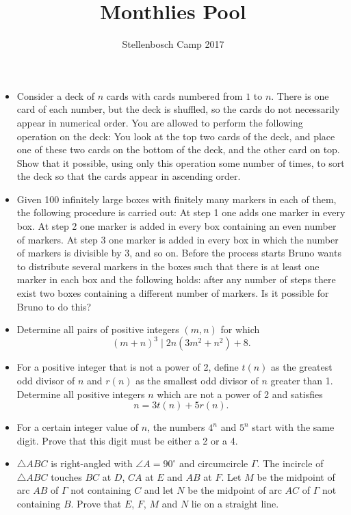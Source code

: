 \documentclass[12pt]{article}
\title{Monthlies Pool}
\author{Stellenbosch Camp 2017}
\begin{document}
 \maketitle

\begin{itemize}

\item %
Consider a deck of $n$ cards with cards numbered from $1$ to $n$. There is one card of each number, but the deck is shuffled, so the cards do not necessarily appear in numerical order. You are allowed to perform the following operation on the deck: You look at the top two cards of the deck, and place one of these two cards on the bottom of the deck, and the other card on top. Show that it possible, using only this operation some number of times, to sort the deck so that the cards appear in ascending order. 


\item %
Given 100 infinitely large boxes with finitely many markers in each of them, the following procedure is carried out: At step 1 one adds one marker in every box. At step 2 one marker is added in every box containing an even number of markers. At step 3 one marker is added in every box in which the number of markers is divisible by 3, and so on. Before the process starts Bruno wants to distribute several markers in the boxes such that there is at least one marker in each box and the following holds: after any number of steps there exist two boxes containing a different number of markers. Is it possible for Bruno to do this?


\item %
Determine all pairs of positive integers $(m,n)$ for which
	\[(m+n)^3 \mid 2n(3m^2+n^2) + 8.\]


\item %
For a positive integer that is not a power of 2, define $t(n)$ as the greatest odd divisor of $n$ and $r(n)$ as the smallest odd divisor of $n$ greater than 1. Determine all positive integers $n$ which are not a power of 2 and satisfies
	\[ n = 3t(n)+5r(n).\]


\item %
For a certain integer value of $n$, the numbers $4^n$ and $5^n$ start with the same digit. Prove that this digit must be either a 2 or a 4.


\item %
$\triangle ABC$ is right-angled with $\angle A=90^\circ$ and circumcircle $\Gamma$. The incircle of $\triangle ABC$ touches $BC$ at $D$, $CA$ at $E$ and $AB$ at $F$. Let $M$ be the midpoint of arc $AB$ of $\Gamma$ not containing $C$ and let $N$ be the midpoint of arc $AC$ of $\Gamma$ not containing $B$. Prove that $E$, $F$, $M$ and $N$ lie on a straight line.



\end{itemize}
\end{document}
